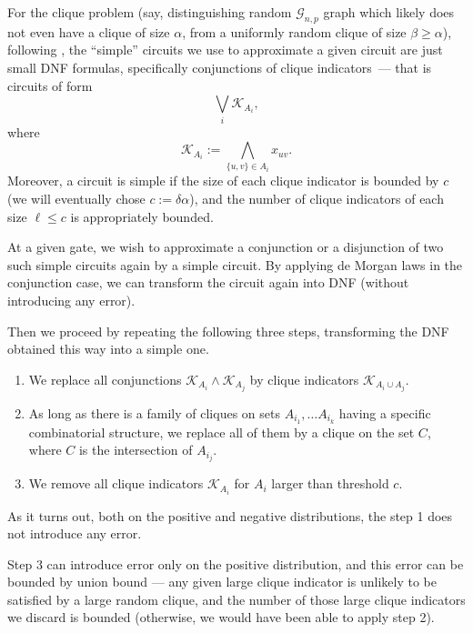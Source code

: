 \documentclass[10pt,a4paper]{article}
\begin{document}
For the clique problem (say, distinguishing random $\mathcal{G}_{n,p}$ graph which likely does not even have a clique of size $\alpha$, from a uniformly random clique of size $\beta \geq \alpha$), following \cite{razborov1985lower,alon87,cavalar2022}, the ``simple'' circuits we use to approximate a given circuit are just small DNF formulas, specifically conjunctions of clique indicators~--- that is circuits of form
\begin{equation*}
    \bigvee_i \mathcal{K}_{A_i},
\end{equation*}
where
\begin{equation*}
    \mathcal{K}_{A_i} := \bigwedge_{ \{u, v\} \in A_i} x_{uv}.
\end{equation*}
Moreover, a circuit is simple if the size of each clique indicator is bounded by $c$ (we will eventually chose $c := \delta \alpha$), and the number of clique indicators of each size $\ell \leq c$ is appropriately bounded.

At a given gate, we wish to approximate a conjunction or a disjunction of two such simple circuits again by a simple circuit. By applying de Morgan laws in the conjunction case, we can transform the circuit again into DNF (without introducing any error).

Then we proceed by repeating the following three steps, transforming the DNF obtained this way into a simple one.
\begin{enumerate}
    \item We replace all conjunctions $\mathcal{K}_{A_i} \land \mathcal{K}_{A_j}$ by clique indicators $\mathcal{K}_{A_i \cup A_j}$.
    \item As long as there is a family of cliques on sets $A_{i_1}, \ldots A_{i_k}$ having a specific combinatorial structure, we replace all of them by a clique on the set $C$, where $C$ is the intersection of $A_{i_j}$.
    \item We remove all clique indicators $\mathcal{K}_{A_i}$ for $A_i$ larger than threshold $c$.
\end{enumerate}

As it turns out, both on the positive and negative distributions, the step 1 does not introduce any error.

Step 3 can introduce error only on the positive distribution, and this error can be bounded by union bound --- any given large clique indicator is unlikely to be satisfied by a large random clique, and the number of those large clique indicators we discard is bounded (otherwise, we would have been able to apply step 2).
\end{document}
